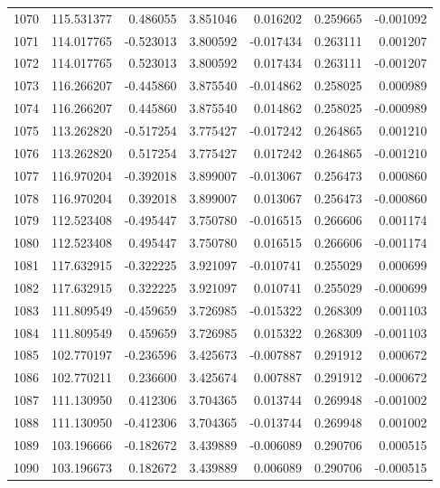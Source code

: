 \begin{tabular}{rrrrrrr}
1070 & 115.531377 &    0.486055 &  3.851046 &    0.016202 &    0.259665 & -0.001092 \\
1071 & 114.017765 &   -0.523013 &  3.800592 &   -0.017434 &    0.263111 &  0.001207 \\
1072 & 114.017765 &    0.523013 &  3.800592 &    0.017434 &    0.263111 & -0.001207 \\
1073 & 116.266207 &   -0.445860 &  3.875540 &   -0.014862 &    0.258025 &  0.000989 \\
1074 & 116.266207 &    0.445860 &  3.875540 &    0.014862 &    0.258025 & -0.000989 \\
1075 & 113.262820 &   -0.517254 &  3.775427 &   -0.017242 &    0.264865 &  0.001210 \\
1076 & 113.262820 &    0.517254 &  3.775427 &    0.017242 &    0.264865 & -0.001210 \\
1077 & 116.970204 &   -0.392018 &  3.899007 &   -0.013067 &    0.256473 &  0.000860 \\
1078 & 116.970204 &    0.392018 &  3.899007 &    0.013067 &    0.256473 & -0.000860 \\
1079 & 112.523408 &   -0.495447 &  3.750780 &   -0.016515 &    0.266606 &  0.001174 \\
1080 & 112.523408 &    0.495447 &  3.750780 &    0.016515 &    0.266606 & -0.001174 \\
1081 & 117.632915 &   -0.322225 &  3.921097 &   -0.010741 &    0.255029 &  0.000699 \\
1082 & 117.632915 &    0.322225 &  3.921097 &    0.010741 &    0.255029 & -0.000699 \\
1083 & 111.809549 &   -0.459659 &  3.726985 &   -0.015322 &    0.268309 &  0.001103 \\
1084 & 111.809549 &    0.459659 &  3.726985 &    0.015322 &    0.268309 & -0.001103 \\
1085 & 102.770197 &   -0.236596 &  3.425673 &   -0.007887 &    0.291912 &  0.000672 \\
1086 & 102.770211 &    0.236600 &  3.425674 &    0.007887 &    0.291912 & -0.000672 \\
1087 & 111.130950 &    0.412306 &  3.704365 &    0.013744 &    0.269948 & -0.001002 \\
1088 & 111.130950 &   -0.412306 &  3.704365 &   -0.013744 &    0.269948 &  0.001002 \\
1089 & 103.196666 &   -0.182672 &  3.439889 &   -0.006089 &    0.290706 &  0.000515 \\
1090 & 103.196673 &    0.182672 &  3.439889 &    0.006089 &    0.290706 & -0.000515 \\

\end{tabular}
